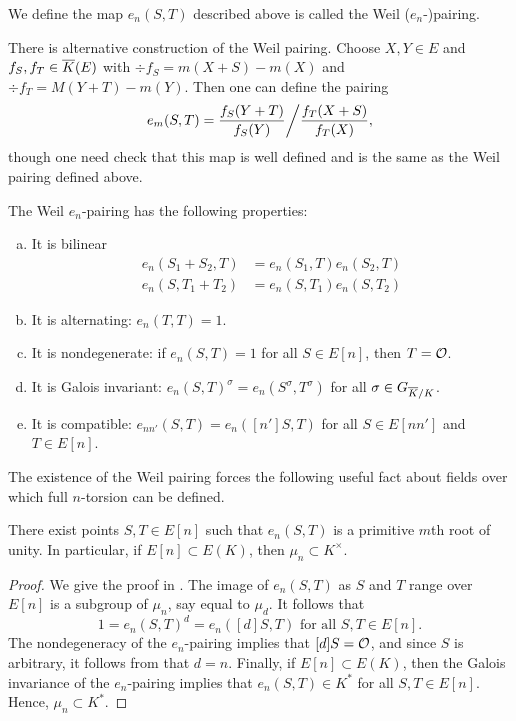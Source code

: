 \begin{dfn}
We define the map $e_n(S,T)$ described above is called the Weil ($e_n$-)pairing. 
\end{dfn}


There is alternative construction of the Weil pairing. Choose $X, Y \in E$ and $f_S, f_T \in \overline{K}(E)$ with $\div f_S= m(X + S) - m(X)$ and $\div f_T= M(Y + T) - m(Y)$. Then one can define the pairing 
	\[
	e_m(S,T) = \dfrac{f_S(Y + T)}{f_S(Y)} \bigg\slash \dfrac{f_T(X + S)}{f_T(X)},
	\]
though one need check that this map is well defined and is the same as the Weil pairing defined above. 


\begin{prop}
The Weil $e_n$-pairing has the following properties: \leavevmode\vspace{-1em}
	\begin{enumerate}[(a)] \itemsep-1em
	\item It is bilinear
		\[
		\begin{aligned}
		e_n(S_1 + S_2, T)&= e_n(S_1,T) e_n(S_2,T) \\
		e_n(S, T_1 + T_2)&= e_n(S,T_1) e_n(S,T_2) 
		\end{aligned}
		\]
	\item It is alternating: $e_n(T,T)= 1$.
	\item It is nondegenerate: if $e_n(S,T)= 1$ for all $S \in E[n]$, then $T= \mathcal{O}$.
	\item It is Galois invariant: $e_n(S,T)^\sigma= e_n(S^\sigma,T^\sigma)$ for all $\sigma \in G_{\overline{K}/K}$.
	\item It is compatible: $e_{nn'}(S,T)= e_n([n']S, T)$ for all $S \in E[nn']$ and $T \in E[n]$. 
	\end{enumerate}
\end{prop}


The existence of the Weil pairing forces the following useful fact about fields over which full $n$-torsion can be defined.


\begin{cor} \label{cor:weilpairing}
There exist points $S, T \in E[n]$ such that $e_n(S,T)$ is a primitive $m$th root of unity. In particular, if $E[n] \subset E(K)$, then $\mu_n \subset K^\times$. 
\end{cor}

\begin{proof}
We give the proof in \cite{silvermanarithmetic}. The image of $e_n(S,T)$ as $S$ and $T$ range over $E[n]$ is a subgroup of $\mu_n$, say equal to $\mu_d$. It follows that
	\[
	1= e_n(S,T)^d= e_n([d]S, T) \text{ for all } S,T \in E[n].
	\]
The nondegeneracy of the $e_n$-pairing implies that $[d]S= \mathcal{O}$, and since $S$ is arbitrary, it follows from \cite[III.6.4]{silvermanarithmetic} that $d= n$. Finally, if $E[n] \subset E(K)$, then the Galois invariance of the $e_n$-pairing implies that $e_n(S,T) \in K^*$ for all $S,T \in E[n]$. Hence, $\mu_n \subset K^*$. 
\end{proof} 



